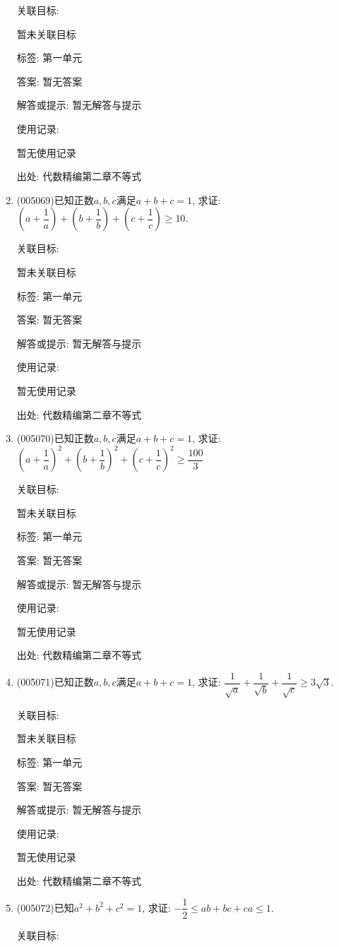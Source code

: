 \documentclass[10pt,a4paper]{article}
\begin{document}
\begin{enumerate}[1.]
关联目标:

暂未关联目标



标签: 第一单元

答案: 暂无答案

解答或提示: 暂无解答与提示

使用记录:

暂无使用记录


出处: 代数精编第二章不等式
\item { (005069)}已知正数$a,b,c$满足$a+b+c=1$, 求证: $(a+\dfrac 1a)+(b+\dfrac 1b)+(c+\dfrac 1c)\ge 10$.


关联目标:

暂未关联目标



标签: 第一单元

答案: 暂无答案

解答或提示: 暂无解答与提示

使用记录:

暂无使用记录


出处: 代数精编第二章不等式
\item { (005070)}已知正数$a,b,c$满足$a+b+c=1$, 求证: $(a+\dfrac 1a)^2+(b+\dfrac 1b)^2+(c+\dfrac 1c)^2\ge \dfrac{100}3$


关联目标:

暂未关联目标



标签: 第一单元

答案: 暂无答案

解答或提示: 暂无解答与提示

使用记录:

暂无使用记录


出处: 代数精编第二章不等式
\item { (005071)}已知正数$a,b,c$满足$a+b+c=1$, 求证: $\dfrac 1{\sqrt a}+\dfrac 1{\sqrt b}+\dfrac 1{\sqrt c}\ge 3\sqrt 3$.


关联目标:

暂未关联目标



标签: 第一单元

答案: 暂无答案

解答或提示: 暂无解答与提示

使用记录:

暂无使用记录


出处: 代数精编第二章不等式
\item { (005072)}已知$a^2+b^2+c^2=1$, 求证: $-\dfrac 12\le ab+bc+ca\le 1$.


关联目标:


\end{enumerate}
\end{document}
